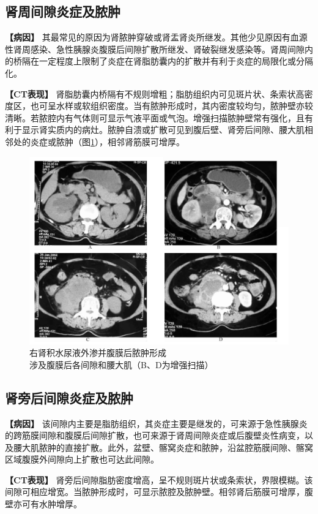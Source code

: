 \subsection{肾周间隙炎症及脓肿}

\textbf{【病因】}
其最常见的原因为肾脓肿穿破或肾盂肾炎所继发。其他少见原因有血源性肾周感染、急性胰腺炎腹膜后间隙扩散所继发、肾破裂继发感染等。肾周间隙内的桥隔在一定程度上限制了炎症在肾脂肪囊内的扩散并有利于炎症的局限化或分隔化。

\textbf{【CT表现】}
肾脂肪囊内桥隔有不规则增粗；脂肪组织内可见斑片状、条索状高密度区，也可呈水样或软组织密度。当有脓肿形成时，其内密度较均匀，脓肿壁亦较清晰。若脓腔内有气体则可显示气液平面或气泡。增强扫描脓肿壁常有强化，且有利于显示肾实质内的病灶。脓肿自溃或扩散可见到腹后壁、肾旁后间隙、腰大肌相邻处的炎症或脓肿（图\ref{fig19-2}），相邻肾筋膜可增厚。

\begin{figure}[!htbp]
 \centering
 \includegraphics[width=.7\textwidth,height=\textheight,keepaspectratio]{./images/Image00382.jpg}
 \captionsetup{justification=centering}
 \caption{右肾积水尿液外渗并腹膜后脓肿形成\\{\small 涉及腹膜后各间隙和腰大肌（B、D为增强扫描）}}
 \label{fig19-2}
  \end{figure} 

\subsection{肾旁后间隙炎症及脓肿}

\textbf{【病因】}
该间隙内主要是脂肪组织，其炎症主要是继发的，可来源于急性胰腺炎的跨筋膜间隙和腹膜后间隙扩散，也可来源于肾周间隙炎症或后腹壁炎性病变，以及腰大肌脓肿的直接扩散。此外，盆壁、髂窝炎症和脓肿，沿盆腔筋膜间隙、髂窝区域腹膜外间隙向上扩散也可达此间隙。

\textbf{【CT表现】}
肾旁后间隙脂肪密度增高，呈不规则斑片状或条索状，界限模糊。该间隙可相应增宽。当脓肿形成时，可显示脓腔及脓肿壁。相邻肾后筋膜可增厚，腹壁亦可有水肿增厚。


